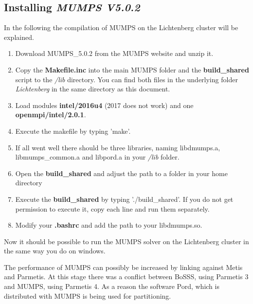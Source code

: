 \subsection{Installing \emph{MUMPS V5.0.2}}
\label{sec:mumps}
In the following the compilation of MUMPS on the Lichtenberg cluster will be explained.
\begin{enumerate}
	\item Download MUMPS\_5.0.2 from the MUMPS website and unzip it.
	\item Copy the \textbf{Makefile.inc} into the main MUMPS folder and the \textbf{build\_shared} script to the \textit{/lib} directory. You can find both files in the underlying folder \textit{Lichtenberg} in the same directory as this document.
	\item Load modules \textbf{intel/2016u4} (2017 does not work) and one \textbf{openmpi/intel/2.0.1}.
	\item Execute the makefile by typing 'make'.
	\item If all went well there should be three libraries, naming libdmumps.a, libmumps\_common.a and libpord.a in your \textit{/lib} folder.
	\item Open the \textbf{build\_shared} and adjust the path to a folder in your home directory
	\item Execute the \textbf{build\_shared} by typing './build\_shared'. If you do not get permission to execute it, copy each line and run them separately.
	\item Modify your \textbf{.bashrc} and add the path to your libdmumps.so.	
\end{enumerate}
Now it should be possible to run the MUMPS solver on the Lichtenberg cluster in the same way you do on windows. 

The performance of MUMPS can possibly be increased by linking against Metis and Parmetis. At this stage there was a conflict between BoSSS, using Parmetis 3 and MUMPS, using Parmetis 4. As a reason the software Pord, which is distributed with MUMPS is being used for partitioning.